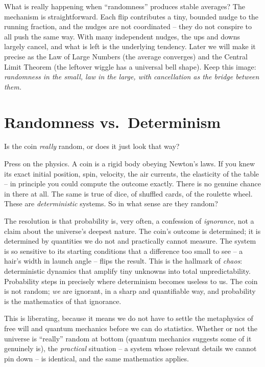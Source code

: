 \begin{happeningbox}
What is really happening when ``randomness'' produces stable averages? The mechanism
is straightforward. Each flip contributes a tiny, bounded nudge to the running fraction, and
the nudges are not coordinated -- they do not conspire to all push the same way.
With many independent nudges, the ups and downs largely cancel, and what is left is
the underlying tendency. Later we
will make it precise as the Law of Large Numbers (the average converges) and the
Central Limit Theorem (the leftover wiggle has a universal bell shape). Keep this
image: \emph{randomness in the small, law in the large, with cancellation as the
bridge between them.}
\end{happeningbox}

\section{Randomness vs.\ Determinism}
\label{ch01:randomness}

Is the coin \emph{really} random, or does it just look that way?

Press on the physics. A coin is a rigid body obeying Newton's laws. If you knew
its exact initial position, spin, velocity, the air currents, the elasticity of the
table -- in principle you could compute the outcome exactly. There is no genuine
chance in there at all. The same is true of dice, of shuffled cards, of the
roulette wheel. These are \emph{deterministic} systems. So in what sense are they
random?

\begin{focusbox}
The resolution is that probability is, very often, a confession of
\emph{ignorance}, not a claim about the universe's deepest nature. The coin's
outcome is determined; it is determined by quantities we do not and practically
cannot measure. The system is so sensitive to its starting conditions that a
difference too small to see -- a hair's width in launch angle -- flips the result.
This is the hallmark of \emph{chaos}: deterministic dynamics that amplify tiny
unknowns into total unpredictability. Probability steps in precisely where
determinism becomes useless to us. The coin is not random; \emph{we} are
ignorant, in a sharp and quantifiable way, and probability is the mathematics of
that ignorance.
\end{focusbox}

This is liberating, because it means we do not have to settle the metaphysics of
free will and quantum mechanics before we can do statistics. Whether or not the
universe is ``really'' random at bottom (quantum mechanics suggests some of it
genuinely is), the \emph{practical} situation -- a system whose relevant details we
cannot pin down -- is identical, and the same mathematics applies.

